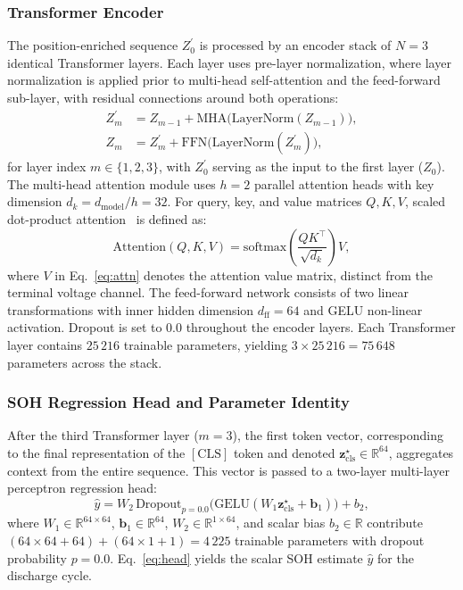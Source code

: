 \documentclass[a4paper,fleqn]{cas-sc}
\begin{document}
\subsubsection{Transformer Encoder}

The position-enriched sequence $Z_0^{\prime}$ is processed by an encoder stack of $N = 3$ identical Transformer layers. Each layer uses pre-layer normalization, where layer normalization is applied prior to multi-head self-attention and the feed-forward sub-layer, with residual connections around both operations:
\begin{align}
Z_m^{\prime} &= Z_{m-1} + \mathrm{MHA}\bigl(\mathrm{LayerNorm}(Z_{m-1})\bigr), \label{eq:pre_ln_mha} \\
Z_m &= Z_m^{\prime} + \mathrm{FFN}\bigl(\mathrm{LayerNorm}(Z_m^{\prime})\bigr), \label{eq:pre_ln_ffn}
\end{align}
for layer index $m \in \{1, 2, 3\}$, with $Z_0^{\prime}$ serving as the input to the first layer ($Z_0$). The multi-head attention module uses $h = 2$ parallel attention heads with key dimension $d_k = d_{\mathrm{model}} / h = 32$. For query, key, and value matrices $Q, K, V$, scaled dot-product attention~\citep{vaswani2017} is defined as:
\begin{equation}
\mathrm{Attention}(Q, K, V) = \mathrm{softmax}\!\left(\frac{QK^{\top}}{\sqrt{d_k}}\right)V,
\label{eq:attn}
\end{equation}
where $V$ in Eq.~\eqref{eq:attn} denotes the attention value matrix, distinct from the terminal voltage channel. The feed-forward network consists of two linear transformations with inner hidden dimension $d_{\mathrm{ff}} = 64$ and GELU non-linear activation. Dropout is set to $0.0$ throughout the encoder layers. Each Transformer layer contains $25\,216$ trainable parameters, yielding $3 \times 25\,216 = 75\,648$ parameters across the stack.

\subsubsection{SOH Regression Head and Parameter Identity}

After the third Transformer layer ($m = 3$), the first token vector, corresponding to the final representation of the $\mathrm{[CLS]}$ token and denoted $\mathbf{z}_{\mathrm{cls}}^{\star} \in \mathbb{R}^{64}$, aggregates context from the entire sequence. This vector is passed to a two-layer multi-layer perceptron regression head:
\begin{equation}
\hat{y} = W_2\,\mathrm{Dropout}_{p=0.0}\bigl(\mathrm{GELU}(W_1 \mathbf{z}_{\mathrm{cls}}^{\star} + \mathbf{b}_1)\bigr) + b_2,
\label{eq:head}
\end{equation}
where $W_1 \in \mathbb{R}^{64 \times 64}$, $\mathbf{b}_1 \in \mathbb{R}^{64}$, $W_2 \in \mathbb{R}^{1 \times 64}$, and scalar bias $b_2 \in \mathbb{R}$ contribute $(64 \times 64 + 64) + (64 \times 1 + 1) = 4\,225$ trainable parameters with dropout probability $p = 0.0$. Eq.~\eqref{eq:head} yields the scalar SOH estimate $\hat{y}$ for the discharge cycle.
\end{document}
